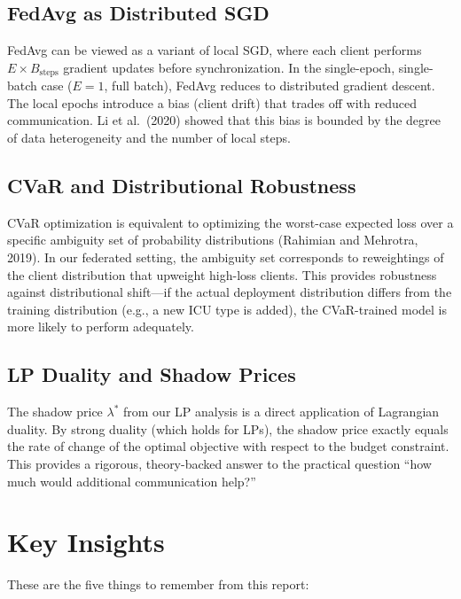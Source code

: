 \documentclass[11pt,a4paper]{report}
\begin{document}
\section{FedAvg as Distributed SGD}

FedAvg can be viewed as a variant of local SGD, where each client performs $E \times B_{\text{steps}}$ gradient updates before synchronization. In the single-epoch, single-batch case ($E=1$, full batch), FedAvg reduces to distributed gradient descent. The local epochs introduce a bias (client drift) that trades off with reduced communication. Li et al.\ (2020) showed that this bias is bounded by the degree of data heterogeneity and the number of local steps.

\section{CVaR and Distributional Robustness}

CVaR optimization is equivalent to optimizing the worst-case expected loss over a specific ambiguity set of probability distributions (Rahimian and Mehrotra, 2019). In our federated setting, the ambiguity set corresponds to reweightings of the client distribution that upweight high-loss clients. This provides robustness against distributional shift---if the actual deployment distribution differs from the training distribution (e.g., a new ICU type is added), the CVaR-trained model is more likely to perform adequately.

\section{LP Duality and Shadow Prices}

The shadow price $\lambda^*$ from our LP analysis is a direct application of Lagrangian duality. By strong duality (which holds for LPs), the shadow price exactly equals the rate of change of the optimal objective with respect to the budget constraint. This provides a rigorous, theory-backed answer to the practical question ``how much would additional communication help?''


\chapter{Key Insights}

These are the five things to remember from this report:
\end{document}
